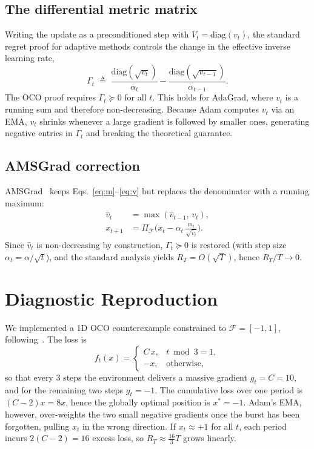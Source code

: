 \documentclass[10pt,twocolumn]{article}
\newcommand{\Proj}{\Pi_{\mathcal{F}}}
\begin{document}
\subsection{The differential metric matrix}
Writing the update as a preconditioned step with $V_t=\mathrm{diag}(v_t)$, the standard regret proof for adaptive methods controls the change in the effective inverse learning rate,
\begin{equation}
\Gamma_t \;\triangleq\; \frac{\mathrm{diag}(\sqrt{v_t})}{\alpha_t}-\frac{\mathrm{diag}(\sqrt{v_{t-1}})}{\alpha_{t-1}}.
\label{eq:gamma}
\end{equation}
The OCO proof requires $\Gamma_t\succeq 0$ for all $t$. This holds for AdaGrad, where $v_t$ is a running sum and therefore non-decreasing. Because Adam computes $v_t$ via an EMA, $v_t$ shrinks whenever a large gradient is followed by smaller ones, generating negative entries in $\Gamma_t$ and breaking the theoretical guarantee.

\subsection{AMSGrad correction}
AMSGrad~\cite{reddi2018convergence} keeps Eqs.~\eqref{eq:m}--\eqref{eq:v} but replaces the denominator with a running maximum:
\begin{align}
\hat v_t &= \max(\hat v_{t-1},\, v_t), \label{eq:vhat}\\
x_{t+1} &= \Proj\!\Big(x_t - \alpha_t\,\frac{m_t}{\sqrt{\hat v_t}}\Big). \label{eq:ams}
\end{align}
Since $\hat v_t$ is non-decreasing by construction, $\Gamma_t\succeq0$ is restored (with step size $\alpha_t=\alpha/\sqrt{t}$), and the standard analysis yields $R_T=O(\sqrt{T})$, hence $R_T/T\to0$.

\section{Diagnostic Reproduction}
We implemented a 1D OCO counterexample constrained to $\mathcal{F}=[-1,1]$, following~\cite{reddi2018convergence}. The loss is
\begin{equation}
f_t(x)=\begin{cases} C\,x, & t \bmod 3 = 1,\\ -x, & \text{otherwise},\end{cases}
\label{eq:loss}
\end{equation}
so that every 3 steps the environment delivers a massive gradient $g_t=C=10$, and for the remaining two steps $g_t=-1$. The cumulative loss over one period is $(C-2)x=8x$, hence the globally optimal position is $x^\ast=-1$. Adam's EMA, however, over-weights the two small negative gradients once the burst has been forgotten, pulling $x_t$ in the wrong direction. If $x_t\approx+1$ for all $t$, each period incurs $2(C-2)=16$ excess loss, so $R_T\approx\tfrac{16}{3}T$ grows linearly.
\end{document}
